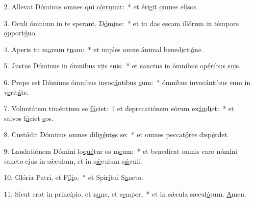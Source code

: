 2. Allevat Dóminus omnes qui c\uline{ó}rr\uline{u}unt:~* et érigit \uline{o}mnes el\uline{í}sos.\par 
3. Oculi ómnium in te sperant, D\uline{ó}m\uline{i}ne:~* et tu das escam illórum in témpore \uline{o}pport\uline{ú}no.\par 
4. Aperis tu m\uline{a}num t\uline{u}am:~* et imples omne ánimal bened\uline{i}cti\uline{ó}ne.\par 
5. Justus Dóminus in ómnibus v\uline{i}is s\uline{u}is:~* et sanctus in ómnibus op\uline{é}ribus s\uline{u}is.\par 
6. Prope est Dóminus ómnibus invoc\uline{á}ntibus \uline{e}um:~* ómnibus invocántibus eum in v\uline{e}rit\uline{á}te.\par 
7. Voluntátem timéntium se \uline{fá}ciet:~† et deprecatiónem eórum ex\uline{áu}d\uline{i}et:~* et salvos f\uline{á}ciet \uline{e}os.\par 
8. Custódit Dóminus omnes dilig\uline{é}nt\uline{e}s se:~* et omnes peccat\uline{ó}res disp\uline{é}rdet.\par 
9. Laudatiónem Dómini lo\uline{qué}tur os m\uline{e}um:~* et benedícat omnis caro nómini sancto ejus in sǽculum, et in s\uline{ǽ}culum s\uline{ǽ}culi.\par 
10. Glória Patri, et F\uline{í}l\uline{i}o,~* et Spir\uline{í}tui S\uline{a}ncto.\par 
11. Sicut erat in princípio, et n\uline{u}nc, et s\uline{e}mper,~* et in sǽcula sæcul\uline{ó}rum. \uline{A}men.\par 
